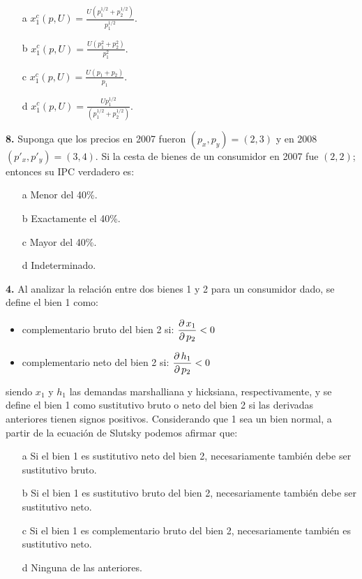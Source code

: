 \documentclass{nuevotema}
\begin{document}
\begin{enumerate}
	\item[a] $x_1^c(p,U) = \frac{U \left( p_1^{1/2} + p_2^{1/2} \right) }{p_1^{1/2}}$.
	\item[b] $x_1^c(p,U) = \frac{U \left( p_1^2 + p_2^2 \right) }{p_1^2}. $
	\item[c] $x_1^c(p,U) = \frac{U \left( p_1 + p_2 \right) }{p_1}. $
	\item[d] $x_1^c(p,U) = \frac{U p_1^{1/2}}{ \left( p_1^{1/2} + p_2^{1/2} \right)}. $
\end{enumerate}

\textbf{8.} Suponga que los precios en 2007 fueron $(p_x, p_y) = (2,3)$ y en 2008 $(p'_x, p'_y) = (3,4)$. Si la cesta de bienes de un consumidor en 2007 fue $(2,2)$; entonces su IPC verdadero es:
\begin{enumerate}
	\item[a] Menor del 40\%.
	\item[b] Exactamente el 40\%.
	\item[c] Mayor del 40\%.
	\item[d] Indeterminado.
\end{enumerate}


\textbf{4.} Al analizar la relación entre dos bienes 1 y 2 para un consumidor dado, se define el bien 1 como:
\begin{itemize}
	\item complementario bruto del bien 2 si: $\dfrac{\partial \, x_1}{\partial \, p_2} < 0$
	\item complementario neto del bien 2 si: $\dfrac{\partial \, h_1}{\partial \, p_2} < 0$
\end{itemize}

siendo $x_1$ y $h_1$ las demandas marshalliana y hicksiana, respectivamente, y se define el bien 1 como sustitutivo bruto o neto del bien 2 si las derivadas anteriores tienen signos positivos. Considerando que 1 sea un bien normal, a partir de la ecuación de Slutsky podemos afirmar que:

\begin{enumerate}
	\item[a] Si el bien 1 es sustitutivo neto del bien 2, necesariamente también debe ser sustitutivo bruto.
	\item[b] Si el bien 1 es sustitutivo bruto del bien 2, necesariamente también debe ser sustitutivo neto.
	\item[c] Si el bien 1 es complementario bruto del bien 2, necesariamente también es sustitutivo neto.
	\item[d] Ninguna de las anteriores. 
\end{enumerate}
\end{document}
